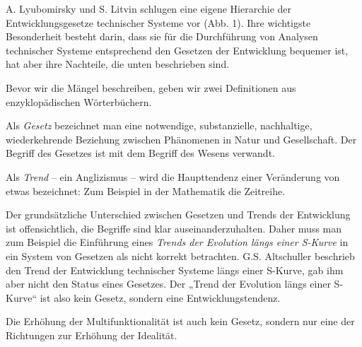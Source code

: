 \documentclass[11pt,a4paper]{article}
\begin{document}
A. Lyubomirsky und S. Litvin schlugen eine eigene Hierarchie der
Entwicklungsgesetze technischer Systeme vor (Abb. 1). Ihre wichtigste
Besonderheit besteht darin, dass sie für die Durchführung von Analysen
technischer Systeme entsprechend den Gesetzen der Entwicklung bequemer ist,
hat aber ihre Nachteile, die unten beschrieben sind.

Bevor wir die Mängel beschreiben, geben wir zwei Definitionen aus
enzyklopädischen Wörter\-büchern.

Als \emph{Gesetz} bezeichnet man eine notwendige, substanzielle, nachhaltige,
wiederkehrende Beziehung zwischen Phänomenen in Natur und Gesellschaft. Der
Begriff des Gesetzes ist mit dem Begriff des Wesens verwandt.

Als \emph{Trend} -- ein Anglizismus -- wird die Haupttendenz einer Veränderung
von etwas bezeichnet: Zum Beispiel in der Mathematik die Zeitreihe.

Der grundsätzliche Unterschied zwischen Gesetzen und Trends der Entwicklung
ist offensichtlich, die Begriffe sind klar auseinanderzuhalten. Daher muss man
zum Beispiel die Einführung eines \emph{Trends der Evolution längs einer
  S-Kurve} in ein System von Gesetzen als nicht korrekt betrachten.
G.S. Altschuller beschrieb den Trend der Entwicklung technischer Systeme längs
einer S-Kurve, gab ihm aber nicht den Status eines Gesetzes. Der „Trend der
Evolution längs einer S-Kurve“ ist also kein Gesetz, sondern eine
Entwicklungstendenz.

Die Erhöhung der Multifunktionalität ist auch kein Gesetz, sondern nur eine
der Richtungen zur Erhöhung der Idealität.
\newpage
\end{document}
